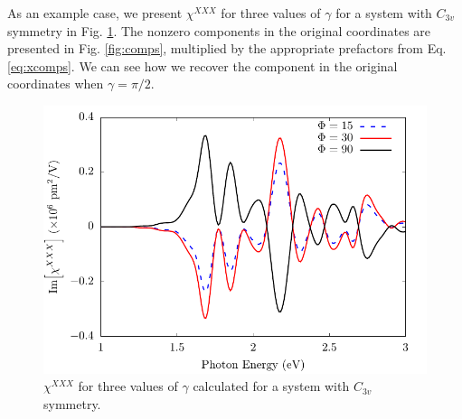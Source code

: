 \documentclass[aps,prb,10pt,letterpaper,notitlepage]{revtex4-1}
\begin{document}
As an example case, we present $\chi^{XXX}$ for three values of $\gamma$ for a
system with $C_{3v}$ symmetry in Fig. \ref{fig:rotxxx}. The nonzero components
in the original coordinates are presented in Fig. \ref{fig:comps}, multiplied by
the appropriate prefactors from Eq. \eqref{eq:xcomps}. We can see how we recover
the component in the original coordinates when $\gamma = \pi/2$.

\begin{figure}[t]
\centering
\includegraphics[width=0.4\linewidth]{rot/rotxxx.pdf}
\caption{$\chi^{XXX}$ for three values of $\gamma$ calculated for a system with
$C_{3v}$ symmetry.}
\label{fig:rotxxx}
\end{figure}
\end{document}
